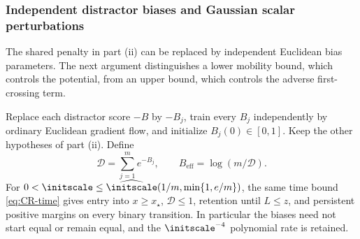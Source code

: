 \subsubsection{Independent distractor biases and Gaussian scalar perturbations}
\label{app:CR-independent}

The shared penalty in part (ii) can be replaced by independent Euclidean bias parameters.
The next argument distinguishes a lower mobility bound, which controls the potential,
from an upper bound, which controls the adverse first-crossing term.



\begin{corollary}
\label{cor:CR-independent}
Replace each distractor score $-B$ by $-B_j$, train every $B_j$ independently by ordinary Euclidean gradient flow,
and initialize $B_j(0)\in[0,1]$. Keep the other hypotheses of part (ii).
Define
\[
 \mathcal D=\sum_{j=1}^m e^{-B_j},\qquad B_{\mathrm{eff}}=\log(m/\mathcal D).
\]
For $0<\initscale\le\widehat\initscale(1/m,\min\{1,e/m\})$, the same time bound \cref{eq:CR-time} gives
entry into $x\ge x_\star$, $\mathcal D\le1$, retention until $L\le z$, and persistent positive margins on every binary transition.
In particular the biases need not start equal or remain equal, and the $\initscale^{-4}$ polynomial rate is retained.
\end{corollary}
